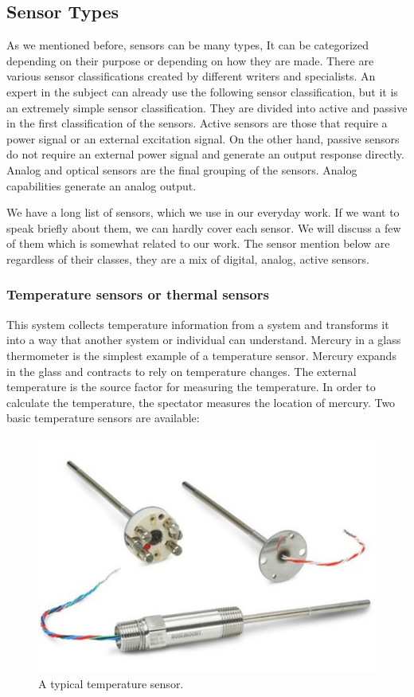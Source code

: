 \subsection{Sensor Types}

As we mentioned before, sensors can be many types, It can be categorized depending on their purpose or depending on how they are made. There are various sensor classifications created by different writers and specialists. An expert in the subject can already use the following sensor classification, but it is an extremely simple sensor classification. They are divided into active and passive in the first classification of the sensors. Active sensors are those that require a power signal or an external excitation signal. On the other hand, passive sensors do not require an external power signal and generate an output response directly. Analog and optical sensors are the final grouping of the sensors. Analog capabilities generate an analog output.

We have a long list of sensors, which we use in our everyday work. If we want to speak briefly about them, we can hardly cover each sensor. We will discuss a few of them which is somewhat related to our work. The sensor mention below are regardless of their classes, they are a mix of digital, analog, active sensors.

\subsubsection{Temperature sensors or thermal sensors}

This system collects temperature information from a system and transforms it into a way that another system or individual can understand. Mercury in a glass thermometer is the simplest example of a temperature sensor. Mercury expands in the glass and contracts to rely on temperature changes. The external temperature is the source factor for measuring the temperature. In order to calculate the temperature, the spectator measures the location of mercury. Two basic temperature sensors are available:

\begin{figure}[h]
  \centering
    \includegraphics[width=0.8\linewidth]{figures/tempSensor.jpg}
    \caption{A typical temperature sensor.}
\label{fig:tempSensor}
\end{figure}


